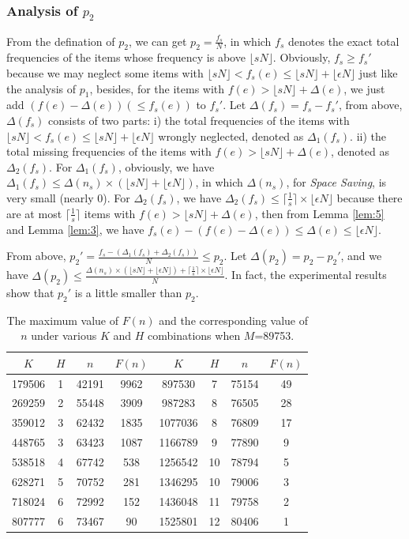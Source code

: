 \documentclass[conference]{IEEEtran}
\begin{document}
\subsubsection{\textbf{Analysis of $p_2$}}
From the defination of $p_2$, we can get $p_2=\frac{f_s}{N}$, in which $f_s$ denotes the exact total frequencies of the items whose frequency is above $\lfloor sN\rfloor$. Obviously, $f_s\geq f_s'$ because we may neglect some items with $\lfloor sN\rfloor<f_s(e)\leq\lfloor sN\rfloor+\lfloor \epsilon N\rfloor$ just like the analysis of $p_1$, besides, for the items with $f(e)>\lfloor sN\rfloor+\Delta(e)$, we just add $(f(e)-\Delta(e))(\leq f_s(e))$ to $f_s'$. Let $\Delta(f_s)=f_s-f_s'$, from above, $\Delta(f_s)$ consists of two parts: i) the total frequencies of the items with $\lfloor sN\rfloor<f_s(e)\leq\lfloor sN\rfloor+\lfloor \epsilon N\rfloor$ wrongly neglected, denoted as $\Delta_1(f_s)$. ii) the total missing frequencies of the items with $f(e)>\lfloor sN\rfloor+\Delta(e)$, denoted as $\Delta_2(f_s)$. For $\Delta_1(f_s)$, obviously, we have $\Delta_1(f_s)\leq\Delta(n_s)\times(\lfloor sN\rfloor+\lfloor \epsilon N\rfloor)$, in which $\Delta(n_s)$, for \emph{Space Saving}, is very small (nearly 0). For $\Delta_2(f_s)$, we have $\Delta_2(f_s)\leq\lceil\frac{1}{s}\rceil\times\lfloor\epsilon N\rfloor$ because there are at most $\lceil\frac{1}{s}\rceil$ items with $f(e)>\lfloor sN\rfloor+\Delta(e)$, then from Lemma \ref{lem:5} and Lemma \ref{lem:3}, we have $f_s(e)-(f(e)-\Delta(e))\leq\Delta(e)\leq\lfloor\epsilon N\rfloor$.\par
From above, $p_2'=\frac{f_s-(\Delta_1(f_s)+\Delta_2(f_s))}{N}\leq p_2$. Let $\Delta(p_2)=p_2-p_2'$, and we have $\Delta(p_2)\leq\frac{\Delta(n_s)\times(\lfloor sN\rfloor+\lfloor \epsilon N\rfloor)+\lceil\frac{1}{s}\rceil\times\lfloor\epsilon N\rfloor}{N}$. In fact, the experimental results show that $p_2'$ is a little smaller than $p_2$.

\begin{table} 
	\centering
	\caption{The maximum value of $F(n)$ and the corresponding value of $n$ under various $K$ and $H$ combinations when $M$=89753.}
	\begin{tabular}{|c|c|c|c||c|c|c|c|}
		\hline
		$K$ & $H$& $n$ & $F(n)$ & $K$ & $H$ & $n$ &$F(n)$\\ 
		\hline
		179506&1&42191&9962&897530&7&75154&49\\
		\hline
		269259&2&55448&3909&987283&8&76505&28\\
		\hline
		359012&3&62432&1835&1077036&8&76809&17\\
		\hline
		448765&3&63423&1087&1166789&9&77890&9\\
		\hline
		538518&4&67742&538&1256542&10&78794&5\\
		\hline
		628271&5&70752&281&1346295&10&79006&3\\
		\hline
		718024&6&72992&152&1436048&11&79758&2\\
		\hline
		807777&6&73467&90&1525801&12&80406&1\\
		\hline
	\end{tabular}
	\label{tab:89753}
\end{table}
\end{document}
